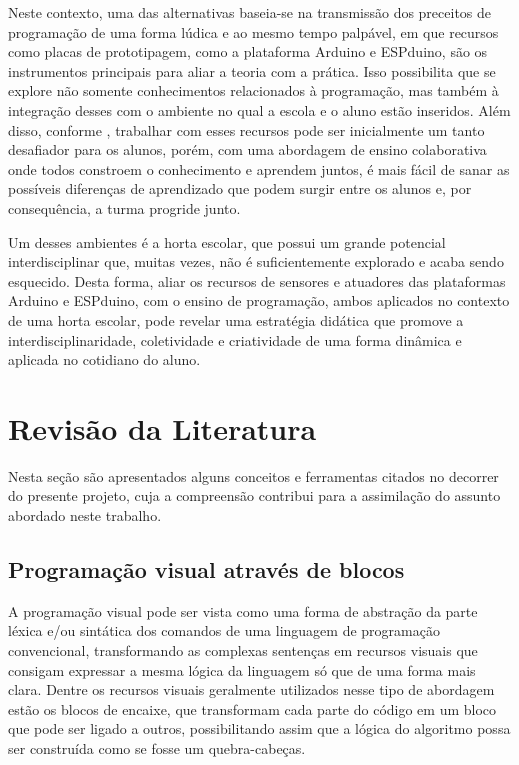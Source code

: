 \documentclass[12pt]{article}
\begin{document}
Neste contexto, uma das alternativas baseia-se na transmissão dos preceitos de programação de uma forma lúdica e ao mesmo tempo palpável, em que recursos como placas de prototipagem, como a plataforma Arduino e ESPduino, são os instrumentos principais para aliar a teoria com a prática. Isso possibilita que se explore não somente conhecimentos relacionados à programação, mas também à integração desses com o ambiente no qual a escola e o aluno estão inseridos. Além disso, conforme \cite{Litts:2017:UHS:3017680.3017740}, trabalhar com esses recursos pode ser inicialmente um tanto desafiador para os alunos, porém, com uma abordagem de ensino colaborativa onde todos constroem o conhecimento e aprendem juntos, é mais fácil de sanar as possíveis diferenças de aprendizado que podem surgir entre os alunos e, por consequência, a turma progride junto.

Um desses ambientes é a horta escolar, que possui um grande potencial interdisciplinar que, muitas vezes, não é suficientemente explorado e acaba sendo esquecido. Desta forma, aliar os recursos de sensores e atuadores das plataformas Arduino e ESPduino, com o ensino de programação, ambos aplicados no contexto de uma horta escolar, pode revelar uma estratégia didática que promove a interdisciplinaridade, coletividade e criatividade de uma forma dinâmica e aplicada no cotidiano do aluno. 
	
	\section{Revisão da Literatura}
	Nesta seção são apresentados alguns conceitos e ferramentas citados no decorrer do presente projeto, cuja a compreensão contribui para a assimilação do assunto abordado neste trabalho.
    
	\subsection{Programação visual através de blocos}
	A programação visual pode ser vista como uma forma de abstração da parte léxica e/ou sintática dos comandos de uma linguagem de programação convencional, transformando as complexas sentenças em recursos visuais que consigam expressar a mesma lógica da linguagem só que de uma forma mais clara. Dentre os recursos visuais geralmente utilizados nesse tipo de abordagem estão os blocos de encaixe, que transformam cada parte do código em um bloco que pode ser ligado a outros, possibilitando assim que a lógica do algoritmo possa ser construída como se fosse um quebra-cabeças.
    
\end{document}

